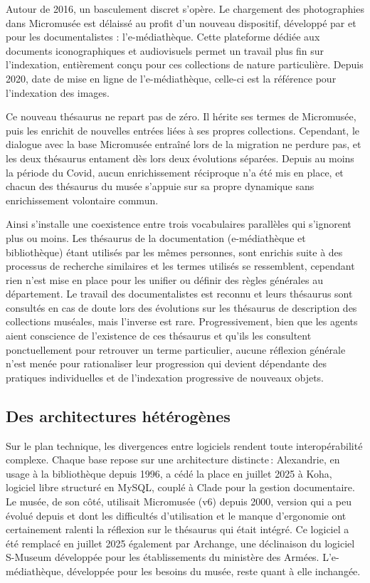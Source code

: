 Autour de 2016, un basculement discret s’opère. Le chargement des photographies dans Micromusée est délaissé au profit d’un nouveau dispositif, développé par et pour les documentalistes : l’e-médiathèque. Cette plateforme dédiée aux documents iconographiques et audiovisuels permet un travail plus fin sur l’indexation, entièrement conçu pour ces collections de nature particulière. Depuis 2020, date de mise en ligne de l'e-médiathèque, celle-ci est la référence pour l’indexation des images.

Ce nouveau thésaurus ne repart pas de zéro. Il hérite ses termes de Micromusée, puis les enrichit de nouvelles entrées liées à ses propres collections. Cependant, le dialogue avec la base Micromusée entraîné lors de la migration ne perdure pas, et les deux thésaurus entament dès lors deux évolutions séparées. Depuis au moins la période du Covid, aucun enrichissement réciproque n’a été mis en place, et chacun des thésaurus du musée s’appuie sur sa propre dynamique sans enrichissement volontaire commun.

Ainsi s'installe une coexistence entre trois vocabulaires parallèles qui s'ignorent plus ou moins. Les thésaurus de la documentation (e-médiathèque et bibliothèque) étant utilisés par les mêmes personnes, sont enrichis suite à des processus de recherche similaires et les termes utilisés se ressemblent, cependant rien n'est mise en place pour les unifier ou définir des règles générales au département. Le travail des documentalistes est reconnu et leurs thésaurus sont consultés en cas de doute lors des évolutions sur les thésaurus de description des collections muséales, mais l'inverse est rare. Progressivement, bien que les agents aient conscience de l'existence de ces thésaurus et qu'ils les consultent ponctuellement pour retrouver un terme particulier, aucune réflexion générale n'est menée pour rationaliser leur progression qui devient dépendante des pratiques individuelles et de l'indexation progressive de nouveaux objets.

\subsection{Des architectures hétérogènes}

Sur le plan technique, les divergences entre logiciels rendent toute interopérabilité complexe. Chaque base repose sur une architecture distincte : Alexandrie, en usage à la bibliothèque depuis 1996, a cédé la place en juillet 2025 à Koha, logiciel libre structuré en MySQL, couplé à Clade pour la gestion documentaire. Le musée, de son côté, utilisait Micromusée (v6) depuis 2000, version qui a peu évolué depuis et dont les difficultés d'utilisation et le manque d'ergonomie ont certainement ralenti la réflexion sur le thésaurus qui était intégré. Ce logiciel a été remplacé en juillet 2025 également par Archange, une déclinaison du logiciel S-Museum développée pour les établissements du ministère des Armées. L’e-médiathèque, développée pour les besoins du musée, reste quant à elle inchangée.

